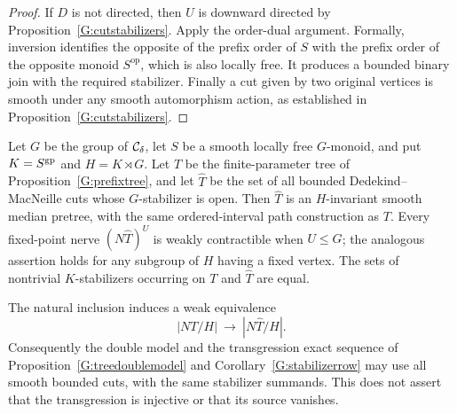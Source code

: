 \begin{proof}
If $D$ is not directed, then $U$ is downward directed by
Proposition~\ref{G:cutstabilizers}. Apply the order-dual
argument. Formally, inversion identifies the opposite of the
prefix order of $S$ with the prefix order of the opposite
monoid $S^{\mathrm{op}}$, which is also locally free. It
produces a bounded binary join with the required stabilizer.
Finally a cut given by two original vertices is smooth under
any smooth automorphism action, as established in
Proposition~\ref{G:cutstabilizers}.
\end{proof}

\begin{proposition}
\label{G:smooth-cut-completion}
Let $G$ be the group of $\mathcal C_\delta$, let $S$ be a smooth locally
free $G$-monoid, and put $K=S^{\mathrm{gp}}$ and $H=K\rtimes G$.
Let $T$ be the finite-parameter tree of
Proposition~\ref{G:prefixtree}, and let $\widehat T$ be the set
of all bounded Dedekind--MacNeille cuts whose $G$-stabilizer
is open. Then $\widehat T$ is an $H$-invariant smooth median
pretree, with the same ordered-interval path construction as
$T$. Every fixed-point nerve $(N\widehat T)^U$ is weakly
contractible when $U\le G$; the analogous assertion holds for
any subgroup of $H$ having a fixed vertex. The sets of
nontrivial $K$-stabilizers occurring on $T$ and $\widehat T$
are equal.

The natural inclusion induces a weak equivalence
\[
 |NT/H|\ \longrightarrow\ |N\widehat T/H|.
\]
Consequently the double model and the transgression exact
sequence of Proposition~\ref{G:treedoublemodel} and
Corollary~\ref{G:stabilizerrow} may use all smooth bounded
cuts, with the same stabilizer summands. This does not assert
that the transgression is injective or that its source vanishes.
\end{proposition}
